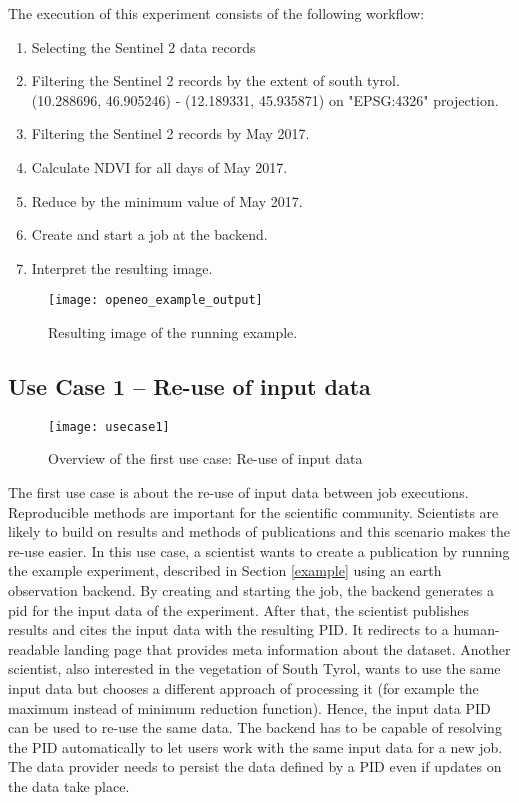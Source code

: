 \documentclass[draft,final]{vutinfth} %
\begin{document}
The execution of this experiment consists of the following workflow:

\begin{enumerate}
	\item Selecting the Sentinel 2 data records
	\item Filtering the Sentinel 2 records by the extent of south tyrol. \\(10.288696, 46.905246) - (12.189331, 45.935871) on "EPSG:4326" projection.
	\item Filtering the Sentinel 2 records by May 2017.
	\item Calculate NDVI for all days of May 2017.
	\item Reduce by the minimum value of May 2017.
	\item Create and start a job at the backend. 
	\item Interpret the resulting image.
\end{enumerate}

\begin{figure}[h]
	\centering
	\texttt{[image: openeo\_example\_output]}
	\caption{Resulting image of the running example.}
	\label{fig:example} %
\end{figure}


\subsection{Use Case 1 – Re-use of input data}\label{UseCase1}
\begin{figure}[h]
	\centering
	\texttt{[image: usecase1]}
	\caption{Overview of the first use case: Re-use of input data}
	\label{fig:usecase1} %
\end{figure}
The first use case is about the re-use of input data between job executions. Reproducible methods are important for the scientific community. Scientists are likely to build on results and methods of publications and this scenario makes the re-use easier. In this use case, a scientist wants to create a publication by running the example experiment, described in Section \ref{example} using an earth observation backend. By creating and starting the job, the backend generates a \gls{pid} for the input data of the experiment. After that, the scientist publishes results and cites the input data with the resulting PID. It redirects to a human-readable landing page that provides meta information about the dataset. Another scientist, also interested in the vegetation of South Tyrol, wants to use the same input data but chooses a different approach of processing it (for example the maximum instead of minimum reduction function). Hence, the input data PID can be used to re-use the same data. The backend has to be capable of resolving the PID automatically to let users work with the same input data for a new job. The data provider needs to persist the data defined by a PID even if updates on the data take place.   
\end{document}
